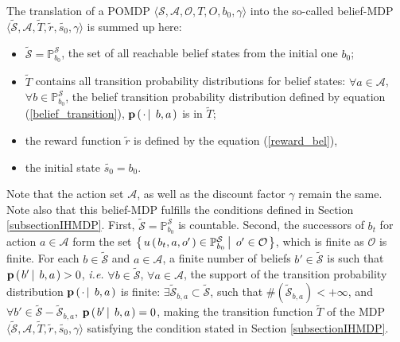 The translation of a POMDP $\langle \mathcal{S}, \mathcal{A}, \mathcal{O}, T, O, b_0, \gamma \rangle$ 
into the so-called belief-MDP $\langle \tilde{\mathcal{S}}, \mathcal{A}, \tilde{T}, \tilde{r}, \tilde{s_0}, \gamma \rangle$ 
is summed up here: 
\begin{itemize}
\item $\tilde{\mathcal{S}} = \mathbb{P}_{b_0}^{\mathcal{S}}$, the set of all reachable belief states from the initial one $b_0$;
\item $\tilde{T}$ contains all transition probability distributions
for belief states: $\forall a \in \mathcal{A}$, $\forall b \in  \mathbb{P}_{b_0}^{\mathcal{S}}$, 
the belief transition probability distribution defined by equation (\ref{belief_transition}),
$\textbf{p} \left( \left.  \cdot \, \right| \left. \, b, a  \right. \right)$ is in $\tilde{T}$; 
\item the reward function $\tilde{r}$ is defined by the equation (\ref{reward_bel}),
\item the initial state $\tilde{s_0} = b_0$.
\end{itemize}
Note that the action set $\mathcal{A}$, as well as the discount factor $\gamma$
remain the same.
Note also that this belief-MDP fulfills the conditions 
defined in Section \ref{subsectionIHMDP}.
First, $\tilde{\mathcal{S}} = \mathbb{P}^{\mathcal{S}}_{b_0}$ is countable.
Second, the successors of $b_t$ for action $a \in \mathcal{A}$ 
form the set $\left\{ \left.  u \left( \left.  b_t,a,o' \right. \right) \in \mathbb{P}^{\mathcal{S}}_{b_0} \, \right| \left. \, o' \in \mathcal{O}  \right. \right\}$,
which is finite as $\mathcal{O}$ is finite.
For each $b \in \tilde{\mathcal{S}}$
and $a \in \mathcal{A}$,
a finite number of beliefs $b' \in \tilde{\mathcal{S}}$ 
is such that $\textbf{p} \left( \left.  b' \, \right| \left. \, b, a  \right. \right)>0$,
\textit{i.e.} $\forall b \in \tilde{\mathcal{S}}$, 
$\forall a \in \mathcal{A}$, 
the support of the transition probability distribution  
$\mathbf{p} \left( \left.  \cdot \, \right| \left. \, b,a  \right. \right)$ is finite: 
$\exists \tilde{\mathcal{S}}_{b,a} \subset \tilde{\mathcal{S}}$, such that
$\# (\tilde{\mathcal{S}}_{b,a})< +\infty$, 
and $\forall b' \in \tilde{\mathcal{S}} - \tilde{\mathcal{S}}_{b,a}$, 
$\textbf{p} \left( \left.  b' \, \right| \left. \, b,a \right. \right)=0$,
making the transition function $\tilde{T}$ 
of the MDP $\langle \tilde{\mathcal{S}}, \mathcal{A}, \tilde{T}, \tilde{r}, \tilde{s_0}, \gamma \rangle$
satisfying the condition stated in Section \ref{subsectionIHMDP}.

